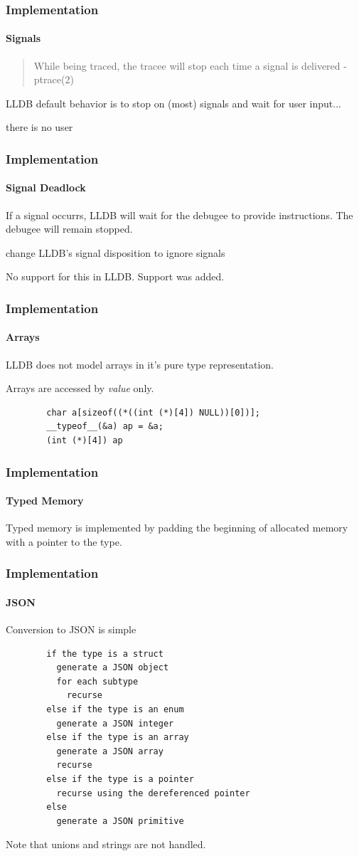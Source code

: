 \documentclass{beamer}
\begin{document}
\begin{frame}
	\frametitle{Implementation}
	\framesubtitle{Signals}

	\begin{quote}
		While being traced, the tracee will stop each time a signal is delivered
		-ptrace(2)
	\end{quote}

	LLDB default behavior is to stop on (most) signals and wait for user input...

	\pause

	there is no user
\end{frame}

\begin{frame}
	\frametitle{Implementation}
	\framesubtitle{Signal Deadlock}

	If a signal occurrs, LLDB will wait for the debugee to provide instructions.
	The debugee will remain stopped.

	\pause

	change LLDB's signal disposition to ignore signals

	No support for this in LLDB. Support was added.
\end{frame}

\begin{frame}[fragile]
	\frametitle{Implementation}
	\framesubtitle{Arrays}

	LLDB does not model arrays in it's pure type representation.

	\pause

	Arrays are accessed by \emph{value} only.

	\pause

	\begin{verbatim}
		char a[sizeof((*((int (*)[4]) NULL))[0])];
		__typeof__(&a) ap = &a;
		(int (*)[4]) ap
	\end{verbatim}
\end{frame}

\begin{frame}
	\frametitle{Implementation}
	\framesubtitle{Typed Memory}

	Typed memory is implemented by padding the beginning of allocated memory with
	a pointer to the type.


\end{frame}

\begin{frame}
	\frametitle{Implementation}
	\framesubtitle{JSON}

	Conversion to JSON is simple

	\begin{Verbatim}
		if the type is a struct
		  generate a JSON object
		  for each subtype
		    recurse
		else if the type is an enum
		  generate a JSON integer
		else if the type is an array
		  generate a JSON array
		  recurse
		else if the type is a pointer
		  recurse using the dereferenced pointer
		else
		  generate a JSON primitive
	\end{Verbatim}

	Note that unions and strings are not handled.
\end{frame}
\end{document}
